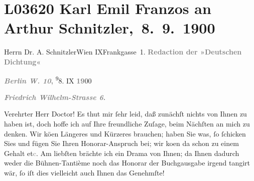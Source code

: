 

\section[ Karl Emil Franzos an Arthur Schnitzler, 8. 9. 1900]{L03620 Karl Emil Franzos an Arthur Schnitzler, 8. 9. 1900}
\nopagebreak{}
\rehead{ }\normalsize\beginnumbering{}
\toendnotes[C]{\smallbreak\pagebreak[2]}
\pstart{}{\pb}Herrn Dr. A.
                     Schnitzler\pend{}\pstart{}Wien IX\pend{}\pstart{}Frankgasse 1.\pend{}{\bigskip}\vspace{1em}
\pstart
           \centering{}{\pb}\textcolor{gray}{\textbf{Redaction der »Deutschen
                        Dichtung«}}\pend
           
\pstart
           \raggedleft{}\textcolor{gray}{\textbf{\textbf{\emph{Berlin W. 10}},}}{ }\substVorne{}\textsuperscript{9}\substDazwischen{}8\substHinten{}. IX \textcolor{gray}{\textbf{19}}00\pend
           
\pstart
           \raggedleft{}\textcolor{gray}{\textbf{\emph{Friedrich Wilhelm-Strasse 6}.}}\pend
           
\pstart{}Verehrter Herr Doctor!\pend\vspace{0.5em}
\pstart
           Es thut mir ſehr leid, daß zunächſt nichts von Ihnen zu haben ist, doch hoffe ich auf
               Ihre freundliche Zuſage, beim Nächſten an mich zu denken. Wir kö{\geminationn}en Längeres und Kürzeres brauchen; haben Sie was, ſo
               ſchicken Sies und fügen Sie Ihren Honorar-Anspruch bei; wir ko{\geminationm}en da{\geminationn} schon zu einem
               Gehalt et\textcolor{gray}{c}. Am liebſten brächte ich ein Drama von Ihnen; da
               Ihnen dadurch weder die Bühnen-Tantième noch das Honorar der Buchgausgabe irgend
               tangirt wär, ſo iſt dies vielleicht auch Ihnen das Genehmſte!\pend
           
